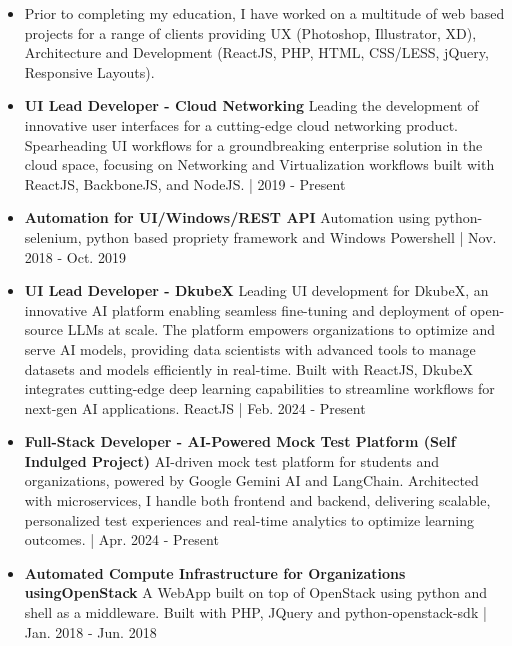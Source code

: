 \documentclass[10pt,a4paper,ragged2e]{altacv}
\begin{document}
\begin{itemize}
\item  Prior to completing my education, I have worked on a multitude of web based projects for a range of clients providing UX (Photoshop, Illustrator, XD), Architecture and Development (ReactJS, PHP, HTML, CSS/LESS, jQuery, Responsive Layouts).
\end{itemize}

\smallskip
\begin{itemize}
\item \textbf{UI Lead Developer - Cloud Networking}
\newline
Leading the development of innovative user interfaces for a cutting-edge cloud networking product. Spearheading UI workflows for a groundbreaking enterprise solution in the cloud space, focusing on Networking and Virtualization workflows built with ReactJS, BackboneJS, and NodeJS. | 2019 - Present
\smallskip
\item \textbf{Automation for UI/Windows/REST API}
\newline
Automation using python-selenium, python based propriety framework and Windows Powershell | Nov. 2018 - Oct. 2019
\smallskip
\item \textbf{UI Lead Developer - DkubeX}
\newline
Leading UI development for DkubeX, an innovative AI platform enabling seamless fine-tuning and deployment of open-source LLMs at scale. The platform empowers organizations to optimize and serve AI models, providing data scientists with advanced tools to manage datasets and models efficiently in real-time. Built with ReactJS, DkubeX integrates cutting-edge deep learning capabilities to streamline workflows for next-gen AI applications. ReactJS | Feb. 2024 - Present
\smallskip
\item \textbf{Full-Stack Developer - AI-Powered Mock Test Platform (Self Indulged Project)}
\newline
AI-driven mock test platform for students and organizations, powered by Google Gemini AI and LangChain. Architected with microservices, I handle both frontend and backend, delivering scalable, personalized test experiences and real-time analytics to optimize learning outcomes. | Apr. 2024 - Present
\smallskip
\item  \textbf{Automated Compute Infrastructure for Organizations using\newline OpenStack}
\newline
A WebApp built on top of OpenStack using python and shell as a middleware. Built with PHP, JQuery and python-openstack-sdk |  Jan. 2018 - Jun. 2018
\end{itemize}
\end{document}
